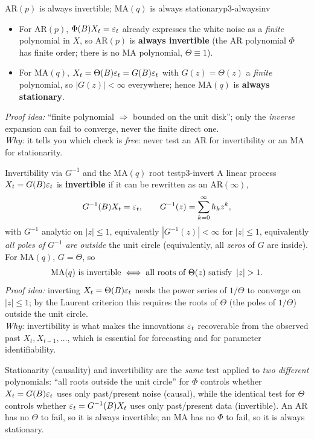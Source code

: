 \begin{proposition}{$\mathrm{AR}(p)$ is always invertible; $\mathrm{MA}(q)$ is always stationary}{p3-alwaysinv}
\begin{itemize}
  \item For $\mathrm{AR}(p)$, $\Phi(B)X_t=\varepsilon_t$ already expresses the white
        noise as a \emph{finite} polynomial in $X$, so $\mathrm{AR}(p)$ is
        \textbf{always invertible} (the AR polynomial $\Phi$ has finite order;
        there is no MA polynomial, $\Theta\equiv1$).
  \item For $\mathrm{MA}(q)$, $X_t=\Theta(B)\varepsilon_t=G(B)\varepsilon_t$ with
        $G(z)=\Theta(z)$ a \emph{finite} polynomial, so $|G(z)|<\infty$
        everywhere; hence $\mathrm{MA}(q)$ is \textbf{always stationary}.
\end{itemize}
\textit{Proof idea:} ``finite polynomial $\Rightarrow$ bounded on the unit
disk''; only the \emph{inverse} expansion can fail to converge, never the
finite direct one.\\
\textit{Why:} it tells you which check is \emph{free}: never test an AR for
invertibility or an MA for stationarity.
\end{proposition}

\begin{proposition}{Invertibility via $G^{-1}$ and the $\mathrm{MA}(q)$ root test}{p3-invert}
A linear process $X_t=G(B)\varepsilon_t$ is \textbf{invertible} if it can be
rewritten as an $\mathrm{AR}(\infty)$,
\[
G^{-1}(B)X_t=\varepsilon_t,\qquad G^{-1}(z)=\sum_{k=0}^{\infty}h_k z^{k},
\]
with $G^{-1}$ analytic on $|z|\le1$, equivalently $|G^{-1}(z)|<\infty$ for
$|z|\le1$, equivalently \emph{all poles of $G^{-1}$ are outside} the unit circle
(equivalently, all \emph{zeros} of $G$ are inside). For $\mathrm{MA}(q)$,
$G=\Theta$, so
\[
\mathrm{MA}(q)\ \text{is invertible}\iff \text{all roots of }\Theta(z)\ \text{satisfy }\left\lvert z \right\rvert>1 .
\]
\textit{Proof idea:} inverting $X_t=\Theta(B)\varepsilon_t$ needs the power series of
$1/\Theta$ to converge on $|z|\le1$; by the Laurent criterion this requires the
roots of $\Theta$ (the poles of $1/\Theta$) outside the unit circle.\\
\textit{Why:} invertibility is what makes the innovations $\varepsilon_t$ recoverable
from the observed past $X_t,X_{t-1},\dots$, which is essential for forecasting
and for parameter identifiability.
\end{proposition}

\begin{intuition}
Stationarity (causality) and invertibility are the \emph{same} test applied to
\emph{two different} polynomials: ``all roots outside the unit circle'' for
$\Phi$ controls whether $X_t=G(B)\varepsilon_t$ uses only past/present noise
(causal), while the identical test for $\Theta$ controls whether
$\varepsilon_t=G^{-1}(B)X_t$ uses only past/present data (invertible). An AR has no
$\Theta$ to fail, so it is always invertible; an MA has no $\Phi$ to fail, so it
is always stationary.
\end{intuition}


